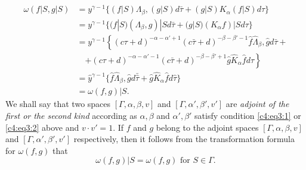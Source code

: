 \begin{align*}
\omega(f|S,g|S) & = y^{\gamma-1} \{(f|S)\Lambda_{\beta}, (g|S)
d\bar{\tau} + (g|S) K_{\alpha} (f|S)d \tau\}\\
& = y^{\gamma-1} \{(f|S) (\Lambda_{\beta},g)|S d\bar{\tau} +
(g|S)(K_{\alpha}f)|S d\tau\}\\
& = y^{\gamma-1}
\left\{(c\tau+d)^{-\alpha-\alpha'+1}(c\bar{\tau}+d)^{-\beta-\beta'-1}
\hat{f} \hat{\Lambda}_{\beta}, \hat{g} d\bar{\tau}+ \right.\\
& \quad \left. + (c\tau+d)^{-\alpha-\alpha'-1}
(c\bar{\tau}+d)^{-\beta-\beta'+1} \hat{g} \hat{K}_{\alpha} \hat{f}
d\tau \right\}\\
& = \hat{y}^{\gamma-1} \{\hat{f}\hat{\Lambda}_{\beta}, \hat{g}
d\bar{\hat{\tau}} + \hat{g} \hat{K}_{\alpha} \hat{f} d\hat{\tau}\}\\
& = \omega(f,g)|S.
\end{align*}
We shall say that two spaces $[\Gamma,\alpha, \beta, v]$ and
$[\Gamma,\alpha', \beta', v']$ are \textit{adjoint of the first or the
second kind} according as $\alpha,\beta$ and $\alpha',\beta'$ satisfy
condition \eqref{c4:eq3:1} or \eqref{c4:eq3:2} 
above and $v\cdot v'=1$. If $f$ and $g$ belong to
the adjoint spaces $[\Gamma, \alpha, \beta,v]$ and $[\Gamma, \alpha',
\beta', v']$ respectively, then it follows 
from \pageoriginale the transformation formula for $\omega(f,g)$ that 
$$
\omega(f,g) |S=\omega(f,g) \text{ for } S \in \Gamma.
$$

